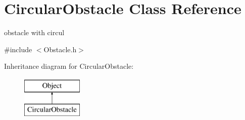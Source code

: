 \hypertarget{classCircularObstacle}{\section{Circular\-Obstacle Class Reference}
\label{classCircularObstacle}
}


obstacle with circul  




{\ttfamily \#include $<$Obstacle.\-h$>$}

Inheritance diagram for Circular\-Obstacle\-:\begin{figure}[H]
\begin{center}
\leavevmode
\includegraphics[height=2.000000cm]{classCircularObstacle}
\end{center}
\end{figure}
